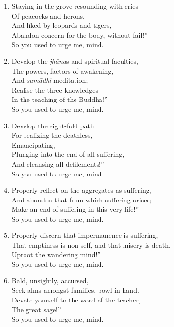\documentclass[10pt, openany]{book}
\newcommand*{\vleftofline}[1]{\leavevmode\llap{#1}}
\begin{document}
\begin{enumerate}
\item \vleftofline{“}Staying in the grove resounding with cries\\
Of peacocks and herons, \\
And liked by leopards and tigers,\\
Abandon concern for the body, without fail!”\\
So you used to urge me, mind.

\item \vleftofline{“}Develop the \emph{jhāna}s and spiritual faculties,\\
The powers, factors of awakening, \\
And \emph{samādhi} meditation;\\
Realise the three knowledges \\
In the teaching of the Buddha!”\\
So you used to urge me, mind.

\item \vleftofline{“}Develop the eight-fold path \\
For realizing the deathless,\\
Emancipating, \\
Plunging into the end of  all suffering,\\
And cleansing all defilements!”\\
So you used to urge me, mind.

\item \vleftofline{“}Properly reflect on the aggregates as suffering,\\
And abandon that from which suffering arises;\\
Make an end of suffering in this very life!”\\
So you used to urge me, mind.

\item \vleftofline{“}Properly discern that impermanence is suffering,\\
That emptiness is non-self, and that misery is death.\\
Uproot the wandering mind!”\\
So you used to urge me, mind.

\item \vleftofline{“}Bald, unsightly, accursed,\\
Seek alms amongst families, bowl in hand.\\
Devote yourself to the word of the teacher, \\
The great sage!”\\
So you used to urge me, mind.


\end{enumerate}
\end{document}
